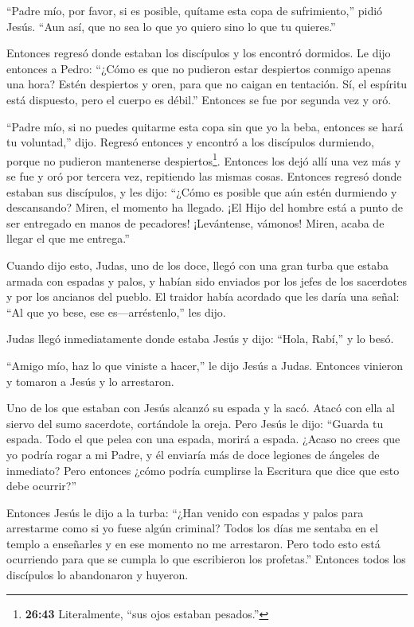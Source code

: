 ``Padre mío, por favor, si es posible, quítame esta copa de
sufrimiento,'' pidió Jesús. ``Aun así, que no sea lo que yo quiero sino
lo que tu quieres.''

 Entonces regresó donde estaban los discípulos y los
encontró dormidos. Le dijo entonces a Pedro: ``¿Cómo es que no pudieron
estar despiertos conmigo apenas una hora?  Estén despiertos
y oren, para que no caigan en tentación. Sí, el espíritu está dispuesto,
pero el cuerpo es débil.''  Entonces se fue por segunda vez
y oró.

``Padre mío, si no puedes quitarme esta copa sin que yo la beba,
entonces se hará tu voluntad,'' dijo.  Regresó entonces y
encontró a los discípulos durmiendo, porque no pudieron mantenerse
despiertos\footnote{\textbf{26:43} Literalmente, ``sus ojos estaban
  pesados.''}.  Entonces los dejó allí una vez más y se fue
y oró por tercera vez, repitiendo las mismas cosas. 
Entonces regresó donde estaban sus discípulos, y les dijo: ``¿Cómo es
posible que aún estén durmiendo y descansando? Miren, el momento ha
llegado. ¡El Hijo del hombre está a punto de ser entregado en manos de
pecadores!  ¡Levántense, vámonos! Miren, acaba de llegar el
que me entrega.''

 Cuando dijo esto, Judas, uno de los doce, llegó con una
gran turba que estaba armada con espadas y palos, y habían sido enviados
por los jefes de los sacerdotes y por los ancianos del pueblo.
 El traidor había acordado que les daría una señal: ``Al
que yo bese, ese es---arréstenlo,'' les dijo.

 Judas llegó inmediatamente donde estaba Jesús y dijo:
``Hola, Rabí,'' y lo besó.

 ``Amigo mío, haz lo que viniste a hacer,'' le dijo Jesús a
Judas. Entonces vinieron y tomaron a Jesús y lo arrestaron.

 Uno de los que estaban con Jesús alcanzó su espada y la
sacó. Atacó con ella al siervo del sumo sacerdote, cortándole la oreja.
 Pero Jesús le dijo: ``Guarda tu espada. Todo el que pelea
con una espada, morirá a espada.  ¿Acaso no crees que yo
podría rogar a mi Padre, y él enviaría más de doce legiones de ángeles
de inmediato?  Pero entonces ¿cómo podría cumplirse la
Escritura que dice que esto debe ocurrir?''

 Entonces Jesús le dijo a la turba: ``¿Han venido con
espadas y palos para arrestarme como si yo fuese algún criminal? Todos
los días me sentaba en el templo a enseñarles y en ese momento no me
arrestaron.  Pero todo esto está ocurriendo para que se
cumpla lo que escribieron los profetas.'' Entonces todos los discípulos
lo abandonaron y huyeron.

